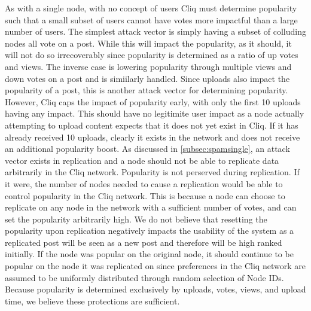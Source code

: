\documentclass{sig-alternate}
\begin{document}
As with a single node, with no concept of users Cliq must determine popularity such that a small subset of users cannot have votes more impactful than a large number of users. 
The simplest attack vector is simply having a subset of colluding nodes all vote on a post. 
While this will impact the popularity, as it should, it will not do so irrecoverably since popularity is determined as a ratio of up votes and views. 
The inverse case is lowering popularity through multiple views and down votes on a post and is simiilarly handled. 
Since uploads also impact the popularity of a post, this is another attack vector for determining popularity. 
However, Cliq caps the impact of popularity early, with only the first 10 uploads having any impact. 
This should have no legitimite user impact as a node actually attempting to upload content expects that it does not yet exist in Cliq. 
If it has already received 10 uploads, clearly it exists in the network and does not receive an additional popularity boost. 
As discussed in \ref{subsec:spamsingle}, an attack vector exists in replication and a node should not be able to replicate data arbitrarily in the Cliq network. 
Popularity is not perserved during replication. 
If it were, the number of nodes needed to cause a replication would be able to control popularity in the Cliq network. 
This is because a node can choose to replicate on any node in the network with a sufficient number of votes, and can set the popularity arbitrarily high. 
We do not believe that resetting the popularity upon replication negatively impacts the usability of the system as a replicated post will be seen as a new post and therefore will be high ranked initially. 
If the node was popular on the original node, it should continue to be popular on the node it was replicated on since preferences in the Cliq network are assumed to be uniformly distributed through random selection of Node IDs. 
Because popularity is determined exclusively by uploads, votes, views, and upload time, we believe these protections are sufficient. 
\end{document}
